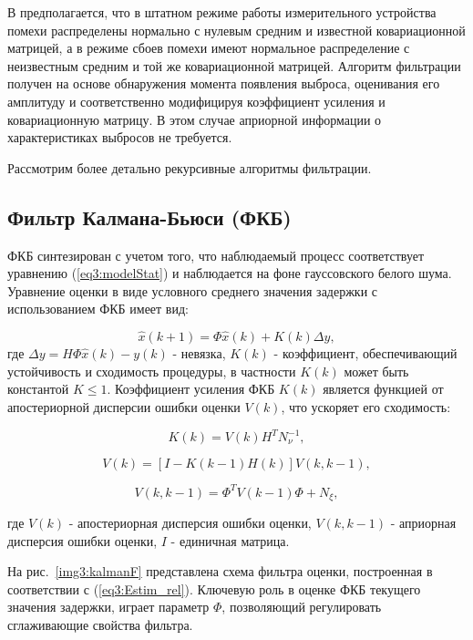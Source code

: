 В \cite{Klekis} предполагается, что в штатном режиме работы измерительного устройства помехи распределены нормально с нулевым средним и известной ковариационной матрицей, а в режиме сбоев помехи имеют нормальное распределение с неизвестным средним и той же ковариационной матрицей.
Алгоритм фильтрации получен на основе обнаружения момента появления выброса, оценивания его амплитуду и соответственно модифицируя коэффициент усиления и ковариационную матрицу. В этом случае априорной информации о характеристиках выбросов не требуется.  

Рассмотрим более детально рекурсивные алгоритмы фильтрации.


\subsection{Фильтр Калмана-Бьюси (ФКБ)}\label{FKB}
 ФКБ синтезирован с учетом того, что наблюдаемый процесс соответствует уравнению (\ref{eq3:modelStat}) и наблюдается на фоне гауссовского белого шума.
 Уравнение оценки в виде условного среднего значения задержки с использованием ФКБ имеет вид:


\begin{equation}\label{eq3:Estim_rel}
\hat{x}(k+1)=\Phi\hat{x}(k)+K(k)\Delta y,
\end{equation}
\noindent где $\Delta y=H\Phi\hat{x}(k)-y(k)$ - невязка, $K(k)$ - коэффициент, обеспечивающий устойчивость и сходимость процедуры, в частности $K(k)$ может быть константой $K\leq1$. 
Коэффициент усиления ФКБ $K(k)$ является функцией от апостериорной дисперсии ошибки оценки $V(k)$, что ускоряет его сходимость:

\begin{equation}\label{eq3:K}
K(k)=V(k)H^TN_{\nu}^{-1},
\end{equation}
 
\begin{equation}\label{eq3:V}
V(k)=[I-K(k-1)H(k)]V(k,k-1),
\end{equation}


\begin{equation}\label{eq3:Vkk-1}
V(k,k-1)=\Phi^TV(k-1)\Phi+N_\xi,
\end{equation}

\noindent где $V(k)$ - апостериорная дисперсия ошибки оценки, $V(k,k-1)$ - априорная дисперсия ошибки оценки, $I$ - единичная матрица.

На рис. \ref{img3:kalmanF} представлена схема фильтра оценки, построенная в соответствии с (\ref{eq3:Estim_rel}). Ключевую роль в оценке ФКБ текущего значения задержки, играет параметр $\Phi$, позволяющий регулировать сглаживающие свойства фильтра. 

